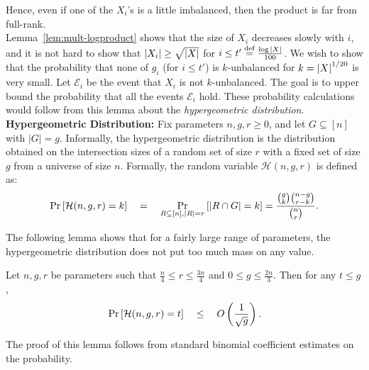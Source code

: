 Hence, even if one of the $X_i$'s is a little imbalanced, then the product is far from full-rank. \\

Lemma~\ref{lem:mult-logproduct} shows that the size of $X_i$ decreases slowly with $i$, and it is not hard to show that $\left|X_i\right| \geq \sqrt{\left|X\right|}$ for $i \leq t'\stackrel{\text{def}}{=}\frac{\log{\left|X\right|}}{100}$. We wish to show that the probability that none of $g_i$ (for $i\leq t'$) is $k$-unbalanced for $k = \left|X\right|^{1/20}$ is very small. Let $\mathcal{E}_i$ be the event that $X_i$ is not $k$-unbalanced. The goal is to upper bound the probability that all the events $\mathcal{E}_i$ hold. These probability calculations would follow from this lemma about the \emph{hypergeometric distribution}.\\

{\bf Hypergeometric Distribution: } Fix parameters $n, g, r \geq 0$, and let $G \subseteq [n]$ with $|G| = g$. Informally, the hypergeometric distribution is the distribution obtained on the intersection sizes of a random set of size $r$ with a fixed set of size $g$ from a universe of size $n$. 
Formally, the random variable $\mathcal{H}(n,g,r)$ is defined as:
$$
\Pr\left[\mathcal{H}(n,g,r) = k\right] \quad = \quad \Pr_{R\subseteq [n],|R| = r}\left[\left|R \cap G\right| = k\right] = \frac{\binom{g}{k}\binom{n-g}{r-k}}{\binom{n}{r}}.
$$


The following lemma shows that for a fairly large range of parameters, the hypergeometric distribution does not put too much mass on any value.

\begin{lemma}\label{lem:hypergeom_low-weight}
  Let $n,g,r$ be parameters such that $\frac{n}{4} \leq r \leq \frac{3n}{4}$ and $0\leq g\leq \frac{2n}{3}$. Then for any $t\leq g$,
  $$
  \Pr\left[\mathcal{H}(n,g,r) = t\right] \quad \leq \quad O\left(\frac{1}{\sqrt{g}}\right).
  $$
\end{lemma}
The proof of this lemma follows from standard binomial coefficient estimates on the probability.\\

